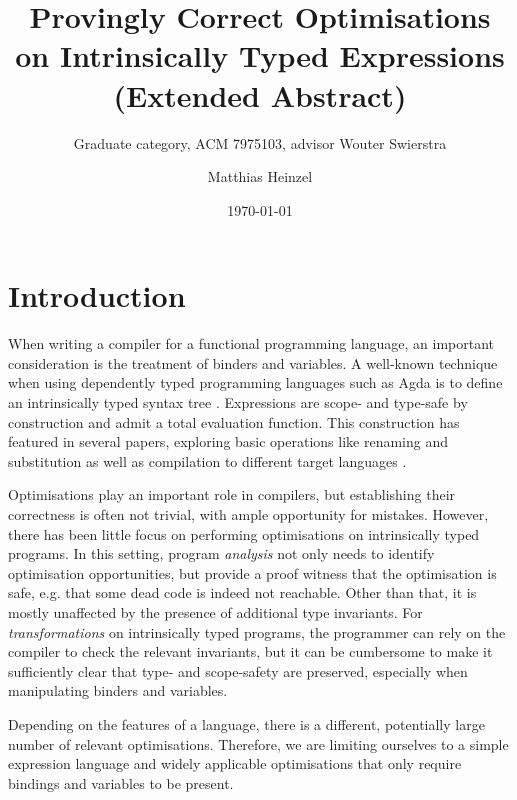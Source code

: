\documentclass[acmsmall,nonacm,review,timestamp]{acmart}
\title{Provingly Correct Optimisations on Intrinsically Typed Expressions (Extended Abstract)}
\subtitle{Graduate category, ACM 7975103, advisor Wouter Swierstra}
\author{Matthias Heinzel}
\affiliation{%
  \institution{Utrecht University}
  \city{Utrecht}
  \country{Netherlands}
  \position{Student (ACM 7975103)}}
\date{\today}
\newcommand{\Draft}[1]{{\color{gray} - #1}}
\newcommand{\Todo}[1]{\todo[inline,backgroundcolor=orange!30]{TODO: #1}}
\begin{document}
\maketitle

\Todo{shorten}

\section{Introduction}

When writing a compiler for a functional programming language,
an important consideration is the treatment of binders and variables.
A well-known technique when using dependently typed programming languages such as Agda
\cite{norell2007agda}
is to define an intrinsically typed syntax tree \cite{augustsson1999intrinsic}.
Expressions are scope- and type-safe by construction and admit a total evaluation function.
This construction has featured in several papers, exploring
basic operations like renaming and substitution
\cite{allais2018universe}
as well as compilation to different target languages
\cite[supplemental material]{pickard2021calculating}.

Optimisations play an important role in compilers, but
establishing their correctness is often not trivial,
with ample opportunity for mistakes.
However, there has been little focus on performing optimisations on intrinsically typed programs.
%
In this setting, program \emph{analysis} not only needs to identify optimisation opportunities,
but provide a proof witness that the optimisation is safe,
e.g. that some dead code is indeed not reachable.
Other than that, it is mostly unaffected by the presence of additional type invariants.
%
For \emph{transformations} on intrinsically typed programs,
the programmer can rely on the compiler to check the relevant invariants,
but it can be cumbersome to make it sufficiently clear that type- and scope-safety are preserved,
especially when manipulating binders and variables.

Depending on the features of a language, there is a different,
potentially large number of relevant optimisations.
Therefore, we are limiting ourselves to a simple expression language
and widely applicable optimisations that only require bindings and variables to be present.
\end{document}
